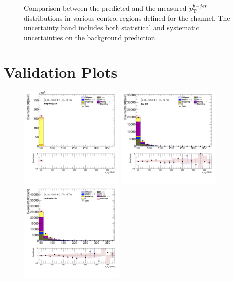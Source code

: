 \begin{figure}[!htp]
\begin{center}
			\end{center}
			\caption{
			Comparison between the predicted and the measured $p_{\text{T}}^{b-jet}$ distributions in various control regions defined for the \taujets channel. The uncertainty band includes both statistical and systematic uncertainties on the background prediction. 
			}
			\label{fig:bkg-bjet-pt-taujets}
		\end{figure}

	\section{\taulep Validation Plots}\label{sec:taulep-valid-plots}

		\begin{figure}[!htp]
			\begin{center}    
			\includegraphics[width=0.45\textwidth]{chapters/chapter6_HPlus/images/taulep/tau_0_pt_DILEP_BTAG.png}
			\includegraphics[width=0.45\textwidth]{chapters/chapter6_HPlus/images/taulep/tau_0_pt_ZEE.png} \\
			\includegraphics[width=0.45\textwidth]{chapters/chapter6_HPlus/images/taulep/tau_0_pt_TAUEL_BVETO.png} 

\end{center}
\end{figure}
